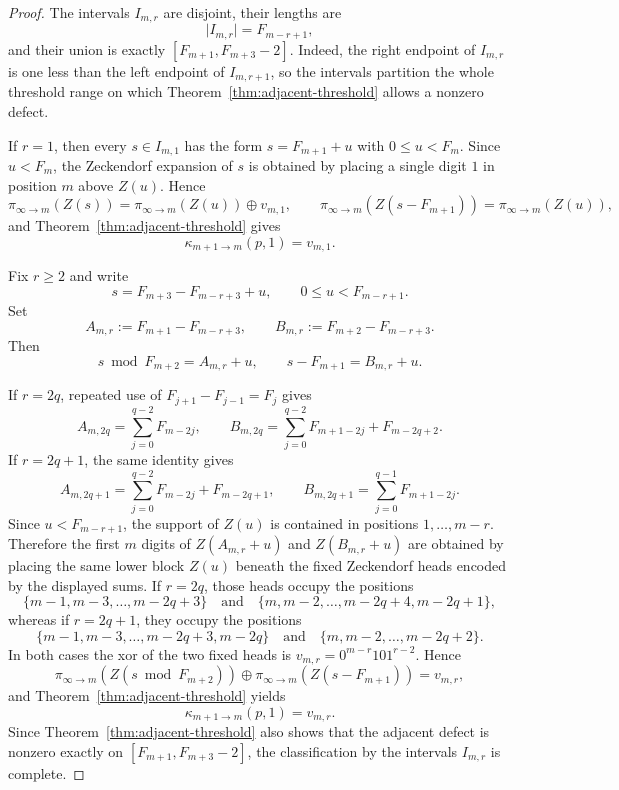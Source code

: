 \documentclass[11pt,reqno]{amsart}
\numberwithin{equation}{section}
\theoremstyle{plain}
\theoremstyle{definition}
\theoremstyle{remark}
\begin{document}
\begin{proof}
The intervals $I_{m,r}$ are disjoint, their lengths are
\[
\lvert I_{m,r}\rvert=F_{m-r+1},
\]
and their union is exactly $[F_{m+1},F_{m+3}-2]$.  Indeed, the right endpoint
of $I_{m,r}$ is one less than the left endpoint of $I_{m,r+1}$, so the
intervals partition the whole threshold range on which
Theorem~\ref{thm:adjacent-threshold} allows a nonzero defect.

If $r=1$, then every $s\in I_{m,1}$ has the form $s=F_{m+1}+u$ with
$0\le u<F_m$.  Since $u<F_m$, the Zeckendorf expansion of $s$ is obtained by
placing a single digit $1$ in position $m$ above $Z(u)$.  Hence
\[
\pi_{\infty\to m}(Z(s))
=
\pi_{\infty\to m}(Z(u))\oplus v_{m,1},
\qquad
\pi_{\infty\to m}(Z(s-F_{m+1}))
=
\pi_{\infty\to m}(Z(u)),
\]
and Theorem~\ref{thm:adjacent-threshold} gives
\[
\kappa_{m+1\to m}(p,1)=v_{m,1}.
\]

Fix $r\ge 2$ and write
\[
s=F_{m+3}-F_{m-r+3}+u,
\qquad
0\le u<F_{m-r+1}.
\]
Set
\[
A_{m,r}:=F_{m+1}-F_{m-r+3},
\qquad
B_{m,r}:=F_{m+2}-F_{m-r+3}.
\]
Then
\[
s\bmod F_{m+2}=A_{m,r}+u,
\qquad
s-F_{m+1}=B_{m,r}+u.
\]

If $r=2q$, repeated use of $F_{j+1}-F_{j-1}=F_j$ gives
\[
A_{m,2q}
=
\sum_{j=0}^{q-2}F_{m-2j},
\qquad
B_{m,2q}
=
\sum_{j=0}^{q-2}F_{m+1-2j}+F_{m-2q+2}.
\]
If $r=2q+1$, the same identity gives
\[
A_{m,2q+1}
=
\sum_{j=0}^{q-2}F_{m-2j}+F_{m-2q+1},
\qquad
B_{m,2q+1}
=
\sum_{j=0}^{q-1}F_{m+1-2j}.
\]
Since $u<F_{m-r+1}$, the support of $Z(u)$ is contained in positions
$1,\dots,m-r$.  Therefore the first $m$ digits of $Z(A_{m,r}+u)$ and
$Z(B_{m,r}+u)$ are obtained by placing the same lower block $Z(u)$ beneath the
fixed Zeckendorf heads encoded by the displayed sums.  If $r=2q$, those heads
occupy the positions
\[
\{m-1,m-3,\dots,m-2q+3\}
\quad\text{and}\quad
\{m,m-2,\dots,m-2q+4,m-2q+1\},
\]
whereas if $r=2q+1$, they occupy the positions
\[
\{m-1,m-3,\dots,m-2q+3,m-2q\}
\quad\text{and}\quad
\{m,m-2,\dots,m-2q+2\}.
\]
In both cases the xor of the two fixed heads is
$v_{m,r}=0^{m-r}10 1^{r-2}$.  Hence
\[
\pi_{\infty\to m}(Z(s\bmod F_{m+2}))
\oplus
\pi_{\infty\to m}(Z(s-F_{m+1}))
=
v_{m,r},
\]
and Theorem~\ref{thm:adjacent-threshold} yields
\[
\kappa_{m+1\to m}(p,1)=v_{m,r}.
\]
Since Theorem~\ref{thm:adjacent-threshold} also shows that the adjacent defect
is nonzero exactly on $[F_{m+1},F_{m+3}-2]$, the classification by the
intervals $I_{m,r}$ is complete.


\end{proof}
\end{document}
